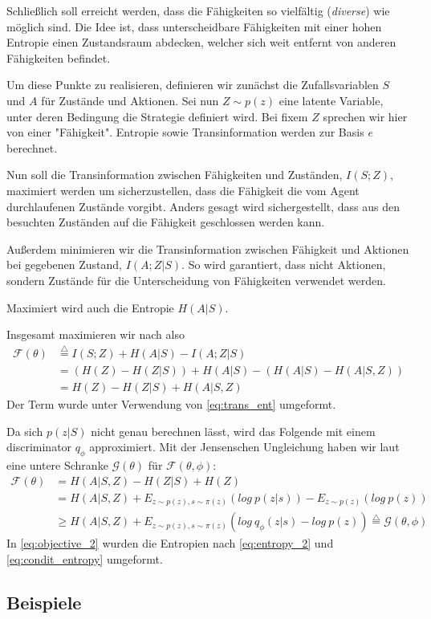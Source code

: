 Schließlich soll erreicht werden, dass die Fähigkeiten so vielfältig (\textit{diverse}) wie möglich sind. Die Idee ist, dass unterscheidbare Fähigkeiten mit einer hohen Entropie einen Zustandsraum abdecken, welcher sich weit entfernt von anderen Fähigkeiten befindet.

\smallspace

Um diese Punkte zu realisieren, definieren wir zunächst die Zufallsvariablen $ S $ und $ A $ für Zustände und Aktionen. Sei nun $ Z \sim p(z) $ eine latente Variable, unter deren Bedingung die Strategie definiert wird. Bei fixem $ Z $ sprechen wir hier von einer "Fähigkeit". Entropie sowie Transinformation werden zur Basis $ e $ berechnet.

Nun soll die Transinformation zwischen Fähigkeiten und Zuständen, $ I(S;Z) $, maximiert werden um sicherzustellen, dass die Fähigkeit die vom Agent durchlaufenen Zustände vorgibt. Anders gesagt wird sichergestellt, dass aus den besuchten Zuständen auf die Fähigkeit geschlossen werden kann.

Außerdem minimieren wir die Transinformation zwischen Fähigkeit und Aktionen bei gegebenen Zustand, $ I(A; Z | S) $. So wird garantiert, dass nicht Aktionen, sondern Zustände für die Unterscheidung von Fähigkeiten verwendet werden.

Maximiert wird auch die Entropie $ H(A|S) $.

\smallspace

Insgesamt maximieren wir nach \cite{diversity_eysenbach} also
\begin{align}
    \mathcal{F}(\theta) &\stackrel{\triangle}{=} I(S;Z) + H(A|S) - I(A;Z|S) \label{eq:objective_1}\\
    & = (H(Z) - H(Z|S)) + H(A|S) - (H(A|S) - H(A|S,Z)) \nonumber\\
    & = H(Z) - H(Z|S) + H(A|S,Z) \label{eq:objective_intuitive}
\end{align}
Der Term wurde unter Verwendung von \eqref{eq:trans_ent} umgeformt.

Da sich $ p(z|S) $ nicht genau berechnen lässt, wird das Folgende mit einem discriminator $ q_\phi $ approximiert. Mit der Jensenschen Ungleichung haben wir laut \cite{diversity_eysenbach} eine untere Schranke $ \mathcal{G}(\theta) $ für $ \mathcal{F}(\theta, \phi) $:
\begin{align}
    \mathcal{F}(\theta) & = H(A|S,Z) - H(Z|S) + H(Z) \nonumber\\
    & = H(A|S,Z) + E_{z \sim p(z), s \sim \pi(z)}(log\ p(z | s)) - E_{z \sim p(z)}(log\ p(z)) \label{eq:objective_2}\\
    & \ge H(A|S,Z) + E_{z \sim p(z), s \sim \pi(z)}(log\ q_\phi(z | s) - log\ p(z)) \stackrel{\triangle}{=} \mathcal{G}(\theta, \phi) \nonumber
\end{align}
In \eqref{eq:objective_2} wurden die Entropien nach \eqref{eq:entropy_2} und \eqref{eq:condit_entropy} umgeformt.

\smallspace


\subsection{Beispiele}
\label{sec:examplesdiversity}
